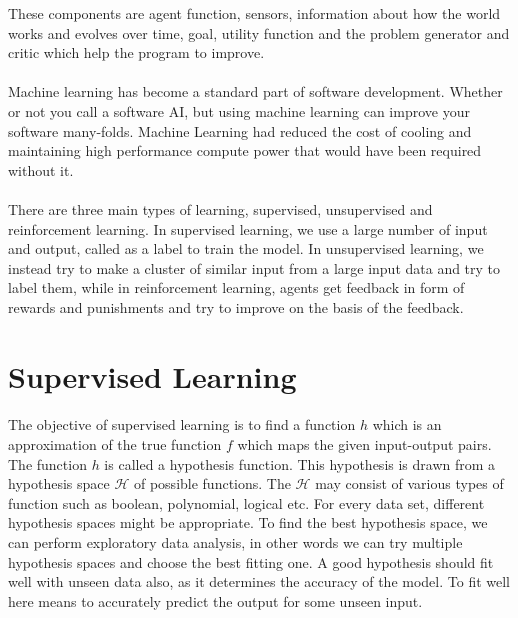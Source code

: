 \documentclass{article}
\begin{document}
    These components are agent function, sensors, information about how the world works and evolves over time, goal, utility function and the problem generator and critic which help the program to improve.

  \paragraph{}
    Machine learning has become a standard part of software development. Whether or not you call a software AI, but using machine learning can improve your software many-folds. Machine Learning had reduced the cost of cooling and maintaining high performance compute power that would have been required without it.	

  \paragraph{}
    There are three main types of learning, supervised, unsupervised and reinforcement learning. In supervised learning, we use a large number of input and output, called as a label to train the model. In unsupervised learning, we instead try to make a cluster of similar input from a large input data and try to label them, while in reinforcement learning, agents get feedback in form of rewards and punishments and try to improve on the basis of the feedback.


\section*{Supervised Learning}
    \paragraph{}
      The objective of supervised learning is to find a function $h$ which is an approximation of the true function $f$ which maps the given input-output pairs. 
      The function $h$ is called a hypothesis function. 
      This hypothesis is drawn from a hypothesis space $\mathcal{H}$ of possible functions. 
      The $\mathcal{H}$ may consist of various types of function such as boolean, polynomial, logical etc. 
      For every data set, different hypothesis spaces might be appropriate. 
      To find the best hypothesis space, we can perform exploratory data analysis, in other words we can try multiple hypothesis spaces and choose the best fitting one. 
      A good hypothesis should fit well with unseen data also, as it determines the accuracy of the model. 
      To fit well here means to accurately predict the output for some unseen input.
    
\end{document}
